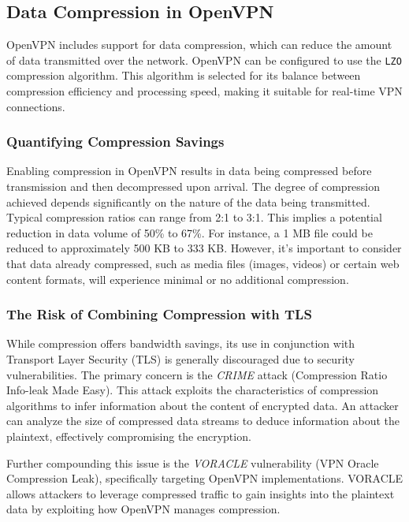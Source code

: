 \subsection{Data Compression in OpenVPN}

OpenVPN includes support for data compression, which can reduce the amount of data transmitted over the network. OpenVPN can be configured to use the \texttt{LZO} compression algorithm. This algorithm is selected for its balance between compression efficiency and processing speed, making it suitable for real-time VPN connections.

\subsubsection{Quantifying Compression Savings}

Enabling compression in OpenVPN results in data being compressed before transmission and then decompressed upon arrival. The degree of compression achieved depends significantly on the nature of the data being transmitted. Typical compression ratios can range from 2:1 to 3:1. This implies a potential reduction in data volume of 50\% to 67\%. For instance, a 1 MB file could be reduced to approximately 500 KB to 333 KB. However, it's important to consider that data already compressed, such as media files (images, videos) or certain web content formats, will experience minimal or no additional compression.

\subsubsection{The Risk of Combining Compression with TLS}

While compression offers bandwidth savings, its use in conjunction with Transport Layer Security (TLS) is generally discouraged due to security vulnerabilities. The primary concern is the \textit{CRIME} attack (Compression Ratio Info-leak Made Easy). This attack exploits the characteristics of compression algorithms to infer information about the content of encrypted data. An attacker can analyze the size of compressed data streams to deduce information about the plaintext, effectively compromising the encryption.

Further compounding this issue is the \textit{VORACLE} vulnerability (VPN Oracle Compression Leak), specifically targeting OpenVPN implementations. VORACLE allows attackers to leverage compressed traffic to gain insights into the plaintext data by exploiting how OpenVPN manages compression.

